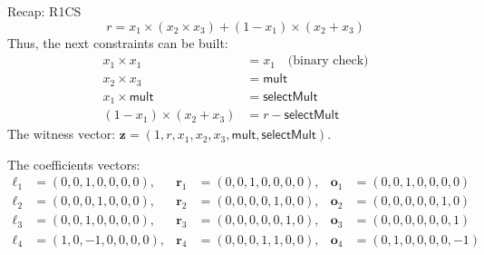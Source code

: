\documentclass{zkdl-presentation-template}
\begin{document}
    \begin{frame}{Recap: R1CS}
        \vspace{-10pt}
        \begin{equation*}
            r = x_1 \times (x_2 \times x_3) + (1 - x_1) \times (x_2 + x_3)
        \end{equation*}\pause
        Thus, the next constraints can be built:
        \vspace{-5pt}
        \begin{align*}
            x_1 \times x_1 &= x_1 \quad \text{(binary check)} \tag{1} \\
            x_2 \times x_3 &= \mathsf{mult} \tag{2} \\
            x_1 \times \mathsf{mult} &= \mathsf{selectMult} \tag{3} \\
            (1 - x_1) \times (x_2 + x_3) &= r - \mathsf{selectMult} \tag{4}
        \end{align*}\pause
        The witness vector: $\mathbf{z} = (1, r, x_1, x_2, x_3, \mathsf{mult}, \mathsf{selectMult})$.

        \vspace{2pt}\pause
        The coefficients vectors:
        \vspace{-25pt}
        {\center\small\begin{align*}
            \boldsymbol{\ell}_1 &= (0, 0, 1, 0, 0, 0, 0), & \boldsymbol{r}_1 &= (0, 0, 1, 0, 0, 0, 0), & \boldsymbol{o}_1 &= (0, 0, 1, 0, 0, 0, 0) \\
            \boldsymbol{\ell}_2 &= (0, 0, 0, 1, 0, 0, 0), & \boldsymbol{r}_2 &= (0, 0, 0, 0, 1, 0, 0), & \boldsymbol{o}_2 &= (0, 0, 0, 0, 0, 1, 0) \\
            \boldsymbol{\ell}_3 &= (0, 0, 1, 0, 0, 0, 0), & \boldsymbol{r}_3 &= (0, 0, 0, 0, 0, 1, 0), & \boldsymbol{o}_3 &= (0, 0, 0, 0, 0, 0, 1) \\
            \boldsymbol{\ell}_4 &= (1, 0, -1, 0, 0, 0, 0), & \boldsymbol{r}_4 &= (0, 0, 0, 1, 1, 0, 0), & \boldsymbol{o}_4 &= (0, 1, 0, 0, 0, 0, -1)
        \end{align*}}
    \end{frame}
\end{document}
